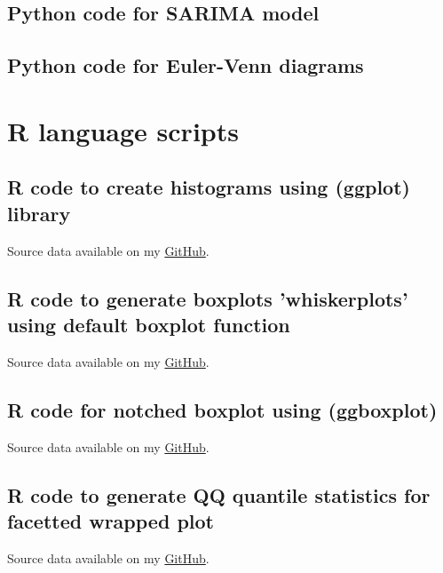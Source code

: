 \documentclass[11pt,a4paper]{report}
\begin{document}
{\begin{appendices}
\subsection{Python code for SARIMA model}\label{P:25}


\subsection{Python code for Euler-Venn diagrams}\label{P:26}


\pagebreak
\section{R language scripts}
\subsection{R code to create histograms using (ggplot) library}\label{R:01}
Source data available on my \href{https://github.com/paulinelemenkova/R-1-Histograms}{GitHub}.

\pagebreak

\subsection{R code to generate boxplots 'whiskerplots' using default boxplot function}\label{R:02}
Source data available on my \href{https://github.com/paulinelemenkova/R-2-Boxplot-Whiskerplot-}{GitHub}.

\pagebreak

\subsection{R code for notched boxplot using (ggboxplot)}\label{R:03}
Source data available on my \href{https://github.com/paulinelemenkova/R-2-Boxplot-Whiskerplot-}{GitHub}.


\subsection{R code to generate \ac{QQ} quantile statistics for facetted wrapped plot}\label{R:04}
Source data available on my \href{https://github.com/paulinelemenkova/R-3-QQ-Statistics-ECDF-Facet-Wrapped}{GitHub}.



\end{appendices}}
\end{document}
